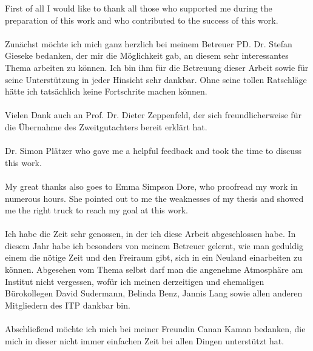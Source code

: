 
First of all I would like to thank all those who supported me during the preparation of this work and who contributed to the success of this work.\\
\\
Zunächst möchte ich mich ganz herzlich bei meinem Betreuer PD. Dr. Stefan Gieseke bedanken, der mir die Möglichkeit gab, an diesem sehr interessantes Thema arbeiten zu können. Ich bin ihm für die Betreuung dieser Arbeit sowie für seine Unterstützung in jeder Hinsicht sehr dankbar. Ohne seine tollen Ratschläge hätte ich tatsächlich keine Fortschrite machen können.\\
\\
Vielen Dank auch an Prof. Dr. Dieter Zeppenfeld, der sich freundlicherweise für die Übernahme des Zweitgutachters bereit erklärt hat.\\
\\
Dr. Simon Plätzer who gave me a helpful feedback and took the time to discuss this work.\\
\\
My great thanks also goes to Emma Simpson Dore, who proofread my work in numerous hours. She pointed out to me the weaknesses of my thesis and showed me the right truck to reach my goal at this work.\\
\\
Ich habe die Zeit sehr genossen, in der ich diese Arbeit abgeschlossen habe. In diesem Jahr habe ich besonders von meinem Betreuer gelernt, wie man geduldig einem die nötige Zeit und den Freiraum gibt, sich in ein Neuland einarbeiten zu können.  Abgesehen vom Thema selbst darf man die angenehme Atmosphäre am Institut nicht vergessen, wofür ich meinen derzeitigen und ehemaligen Bürokollegen David Sudermann, Belinda Benz, Jannis Lang sowie allen anderen Mitgliedern des ITP dankbar bin.\\
\\ 
Abschließend möchte ich mich bei meiner Freundin Canan Kaman bedanken, die mich in dieser nicht immer einfachen Zeit bei allen Dingen unterstützt hat.\\


 
         

